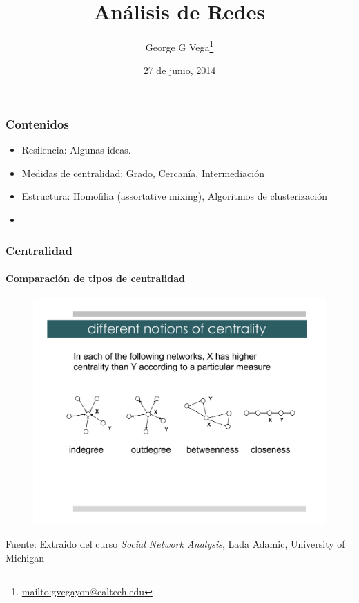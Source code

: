\documentclass[10pt]{beamer}
\author{George G Vega\thanks{\url{mailto:gvegayon@caltech.edu}}}
\institute{Superintendencia de Pensiones}
\title{An\'alisis de Redes}
\date{27 de junio, 2014}
\begin{document}
\frame{\maketitle}

\begin{frame}
\frametitle{Contenidos}
\tableofcontents
\end{frame}

\begin{frame}
\begin{itemize}
\item Resilencia: Algunas ideas.
\item Medidas de centralidad: Grado, Cercan\'ia, Intermediaci\'on
\item Estructura: Homofilia (assortative mixing), Algoritmos de clusterizaci\'on
\item 
\end{itemize}
\end{frame}

\begin{frame}
\frametitle{Centralidad}
\framesubtitle{Comparaci\'on de tipos de centralidad}
\begin{figure}
\includegraphics[trim=2cm 6cm 2cm 4cm, clip=true, width=\linewidth]{Lecture3Acentrality_comparison.pdf}
\end{figure}
{\footnotesize Fuente: Extraido del curso \emph{Social Network Analysis}, Lada
Adamic, University of Michigan}
\end{frame}
\end{document}
